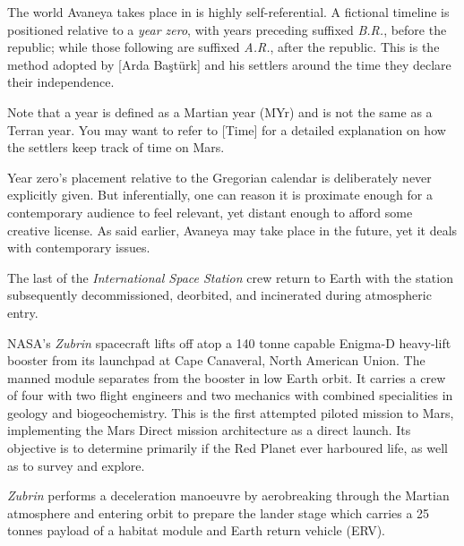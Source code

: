 
\startlines

The world Avaneya takes place in is highly self-referential. A fictional timeline is positioned relative to a {\it year zero}, with years preceding suffixed {\it B.R.}, before the republic; while those following are suffixed {\it A.R.}, after the republic. This is the method adopted by [Arda Baştürk] and his settlers around the time they declare their independence.

Note that a year is defined as a Martian year (MYr) and is not the same as a Terran year. You may want to refer to [Time] for a detailed explanation on how the settlers keep track of time on Mars.

Year zero's placement relative to the Gregorian calendar is deliberately never explicitly given. But inferentially, one can reason it is proximate enough for a contemporary audience to feel relevant, yet distant enough to afford some creative license. As said earlier, Avaneya may take place in the future, yet it deals with contemporary issues.
\crlf

The last of the {\it International Space Station} crew return to Earth with the station subsequently decommissioned, deorbited, and incinerated during atmospheric entry.
\StopTimelineDate

NASA's {\it Zubrin} spacecraft lifts off atop a 140 tonne capable Enigma-D heavy-lift booster from its launchpad at Cape Canaveral, North American Union. The manned module separates from the booster in low Earth orbit. It carries a crew of four with two flight engineers and two mechanics with combined specialities in geology and biogeochemistry. This is the first attempted piloted mission to Mars, implementing the Mars Direct mission architecture as a direct launch. Its objective is to determine primarily if the Red Planet ever harboured life, as well as to survey and explore.
\StopTimelineDate

{\it Zubrin} performs a deceleration manoeuvre by aerobreaking through the Martian atmosphere and entering orbit to prepare the lander stage which carries a 25 tonnes payload of a habitat module and Earth return vehicle (ERV).
\StopTimelineDate

